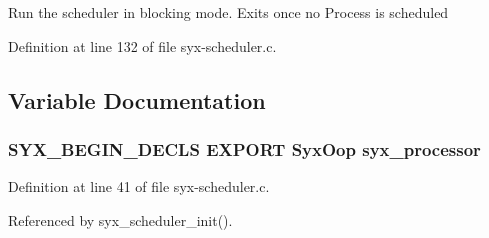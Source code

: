 Run the scheduler in blocking mode. Exits once no Process is scheduled 

Definition at line 132 of file syx-scheduler.c.

\subsection{Variable Documentation}
\hypertarget{syx-scheduler_8h_7a21f5718c04cc99b3c4aaf22bdd6d7b}{
\subsubsection{\setlength{\rightskip}{0pt plus 5cm}SYX\_\-BEGIN\_\-DECLS EXPORT {\bf SyxOop} {\bf syx\_\-processor}}}
\label{syx-scheduler_8h_7a21f5718c04cc99b3c4aaf22bdd6d7b}




Definition at line 41 of file syx-scheduler.c.

Referenced by syx\_\-scheduler\_\-init().